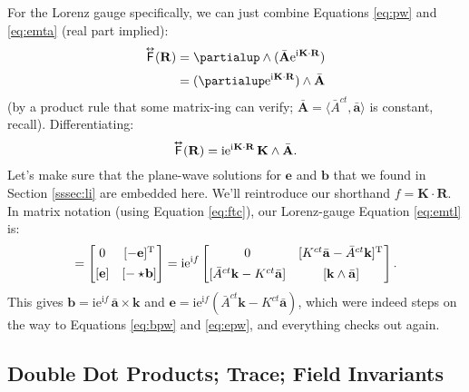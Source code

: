 \documentclass[12pt]{article}
\renewcommand{\vv}[1]{\mathbf{#1}}
\newcommand{\capdy}[1]{ \overset{ \text{\tiny$\bm\leftrightarrow$} }{\vphantom{\text{\small{A}}}\smash{#1}} }
\begin{document}
For the Lorenz gauge specifically, we can just combine Equations \ref{eq:pw} and \ref{eq:emta} (real part implied):
\begin{equation*}
\begin{split}
\capdy{\mathsf{F}} (\vv R) &= \partialup \wedge (  \bar{\vv A} \mathrm{e}^{\mathrm{i} \mkern.5mu \vv K \cdot \vv R} ) \\[2pt]
&= ( \partialup \mathrm{e}^{\mathrm{i} \mkern.5mu \vv K \cdot \vv R} ) \wedge \bar{\vv A}
\end{split}
\end{equation*}
(by a product rule that some matrix-ing can verify; $\bar{\vv A} = \langle \bar{A}^{ct}, \bar{\vv a} \rangle$ is constant, recall). Differentiating:
\begin{equation}\label{eq:emtl}
\capdy{\mathsf{F}} (\vv R) = \mathrm{i} \mathrm{e}^{\mathrm{i} \mkern.5mu \vv K \cdot \vv R} \, \vv K \wedge \bar{\vv A} .
\end{equation}
Let's make sure that the plane-wave solutions for $\vv e$ and $\vv b$ that we found in Section \ref{sssec:li} are embedded here. We'll reintroduce our shorthand $f = \vv K \cdot \vv R$. In matrix notation (using Equation \ref{eq:ftc}), our Lorenz-gauge Equation \ref{eq:emtl} is:
\begin{equation*}
[ \capdy{\mathsf{F}} ]
=
\begin{bmatrix}
0 & [ - \vv e]^\mathrm{T} \\[1ex]
[\vv e] & [ - \star \mkern-3mu \vv b ]
\end{bmatrix}
=
\mathrm{i} \mathrm{e}^{\mathrm{i} f}
\begin{bmatrix}
0 & [K^{ct} \bar{\vv a} - \bar{A}^{ct} \vv k ]^\mathrm{T} \mkern1mu \\[1ex]
[\bar{A}^{ct} \vv k - K^{ct} \bar{\vv a}] & [ \vv k \wedge \bar{\vv a} ] 
\end{bmatrix} .
\end{equation*}
This gives $\vv b = \mathrm{i} \mathrm{e}^{\mathrm{i} f} \, \bar{\vv a} \times \vv k$ and $\vv e = \mathrm{i} \mathrm{e}^{\mathrm{i} f} ( \bar{A}^{ct} \vv k - K^{ct} \bar{\vv a} )$, which were indeed steps on the way to Equations \ref{eq:bpw} and \ref{eq:epw}, and everything checks out again.


\subsection{Double Dot Products; Trace; Field Invariants}\label{sssec:dd}
\end{document}
